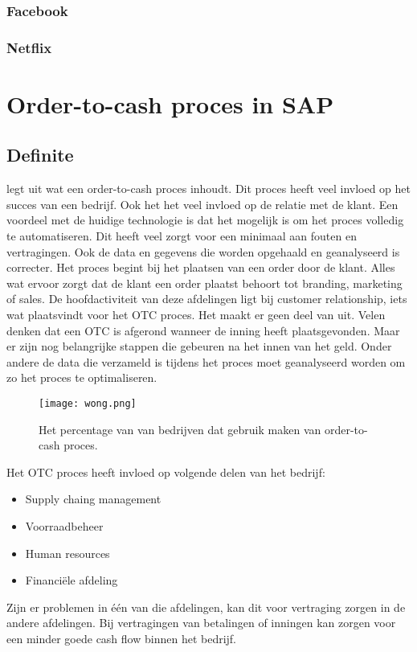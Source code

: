 \subsubsection{Facebook}
\subsubsection{Netflix}

\section{Order-to-cash proces in SAP}
\subsection{Definite}
\textcite{Wong2018} legt uit wat een order-to-cash proces inhoudt. Dit proces heeft veel invloed op het succes van een bedrijf. Ook het het veel invloed op de relatie met de klant. Een voordeel met de huidige technologie is dat het mogelijk is om het proces volledig te automatiseren. Dit heeft veel zorgt voor een minimaal aan fouten en vertragingen. Ook de data en gegevens die worden opgehaald en geanalyseerd is correcter. 
Het proces begint bij het plaatsen van een order door de klant. Alles wat ervoor zorgt dat de klant een order plaatst behoort tot branding, marketing of sales. De hoofdactiviteit van deze afdelingen ligt bij customer relationship, iets wat plaatsvindt voor het OTC proces. Het maakt er geen deel van uit. 
Velen denken dat een OTC is afgerond wanneer de inning heeft plaatsgevonden. Maar er zijn nog belangrijke stappen die gebeuren na het innen van het geld. Onder andere de data die verzameld is tijdens het proces moet geanalyseerd worden om zo het proces te optimaliseren. 
\begin{figure}[h]
	\texttt{[image: wong.png]}
	\caption{Het percentage van van bedrijven dat gebruik maken van order-to-cash proces. \textcite{Wong2018}}
	\centering
\end{figure}
Het OTC proces heeft invloed op volgende delen van het bedrijf:
\begin{itemize}
	\item Supply chaing management
	\item Voorraadbeheer
	\item Human resources
	\item Financiële afdeling
\end{itemize}
Zijn er problemen in één van die afdelingen, kan dit voor vertraging zorgen in de andere afdelingen. Bij vertragingen van betalingen of inningen kan zorgen voor een minder goede cash flow binnen het bedrijf. 
